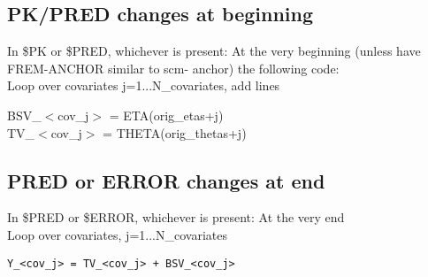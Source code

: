\subsection{PK/PRED changes at beginning}
In \$PK or \$PRED, whichever is present:
At the very beginning (unless have FREM-ANCHOR similar to scm- anchor) the following code: \\
Loop over covariates j=1...N\_covariates, %
add lines

\noindent BSV\_$<$cov\_j$>$ = ETA(orig\_etas+j)\\
\noindent TV\_$<$cov\_j$>$ = THETA(orig\_thetas+j)


\subsection{PRED or ERROR changes at end}
In \$PRED or \$ERROR, whichever is present:
At the very end\\
Loop over covariates, j=1...N\_covariates %
\begin{verbatim}
Y_<cov_j> = TV_<cov_j> + BSV_<cov_j>
\end{verbatim}


